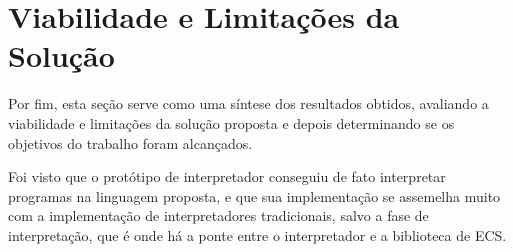 





\section{Viabilidade e Limitações da Solução}

Por fim, esta seção serve como uma síntese dos resultados obtidos, avaliando a viabilidade e limitações da solução proposta e depois determinando se os objetivos do trabalho foram alcançados.

Foi visto que o protótipo de interpretador conseguiu de fato interpretar programas na linguagem proposta, e que sua implementação se assemelha muito com a implementação de interpretadores tradicionais, salvo a fase de interpretação, que é onde há a ponte entre o interpretador e a biblioteca de ECS.

